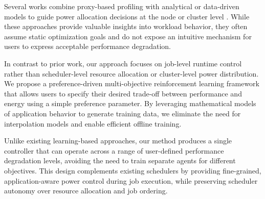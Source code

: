 Several works combine proxy-based profiling with analytical or data-driven models to guide power allocation decisions at the node or cluster level \cite{MOML,OS_noise}. While these approaches provide valuable insights into workload behavior, they often assume static optimization goals and do not expose an intuitive mechanism for users to express acceptable performance degradation.

In contrast to prior work, our approach focuses on job-level runtime control rather than scheduler-level resource allocation or cluster-level power distribution. We propose a preference-driven multi-objective reinforcement learning framework that allows users to specify their desired trade-off between performance and energy using a simple preference parameter. By leveraging mathematical models of application behavior to generate training data, we eliminate the need for interpolation models and enable efficient offline training.

Unlike existing learning-based approaches, our method produces a single controller that can operate across a range of user-defined performance degradation levels, avoiding the need to train separate agents for different objectives. This design complements existing schedulers by providing fine-grained, application-aware power control during job execution, while preserving scheduler autonomy over resource allocation and job ordering.